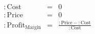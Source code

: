 \documentclass{article}
\begin{document}
\begin{eqnarray*}
\mathrm{:Cost}&=&0\\
\mathrm{:Price}&=&0\\
\mathrm{:Profit}_{\mathrm{{Margin}}}&=&\frac{\mathrm{:Price}-\mathrm{:Cost}}{\mathrm{:Cost}}\\
\end{eqnarray*}
\end{document}

